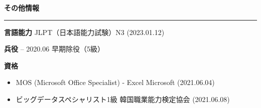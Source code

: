 \documentclass[a4paper, 10pt]{article}
\newcommand{\resumesection}[1]{%
  \vspace{8pt}
  \noindent
  {\large\bfseries #1}
  \vspace{2pt}
  \noindent\hrule
  \vspace{4pt}
}
\begin{document}

\newpage

\resumesection{\japanesefont その他情報}

\vspace{3pt}
\noindent
\textbf{\japanesefont 言語能力} \hfill \japanesefont JLPT（日本語能力試験）N3 (2023.01.12)

\vspace{2pt}
\noindent
\textbf{\japanesefont 兵役} \hfill {} -- 2020.06 早期除役（5級）

\vspace{2pt}
\noindent
\textbf{\japanesefont 資格}

\begin{itemize}
  \setlength{\itemsep}{1pt}
  \setlength{\parskip}{0pt}
  \item \japanesefont MOS (Microsoft Office Specialist) - Excel \hfill Microsoft (2021.06.04)
  \item \japanesefont ビッグデータスペシャリスト1級 \hfill \japanesefont 韓国職業能力検定協会 (2021.06.08)
\end{itemize}
\end{document}
